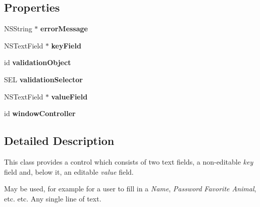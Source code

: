 \subsection*{Properties}
\begin{CompactItemize}
\item 
\hypertarget{interface_s_s_y_labelled_text_field_eec5fc235f435887da8cca159bb17678}{
NSString $\ast$ \textbf{errorMessage}}
\label{interface_s_s_y_labelled_text_field_eec5fc235f435887da8cca159bb17678}

\item 
\hypertarget{interface_s_s_y_labelled_text_field_64538da066a5d16f8b5b86cc25fa803f}{
NSTextField $\ast$ \textbf{keyField}}
\label{interface_s_s_y_labelled_text_field_64538da066a5d16f8b5b86cc25fa803f}

\item 
\hypertarget{interface_s_s_y_labelled_text_field_fd9812fce2d7827fb8a0de538bfdce57}{
id \textbf{validationObject}}
\label{interface_s_s_y_labelled_text_field_fd9812fce2d7827fb8a0de538bfdce57}

\item 
\hypertarget{interface_s_s_y_labelled_text_field_f26505ea73ed035bcf7b86f1c47a9177}{
SEL \textbf{validationSelector}}
\label{interface_s_s_y_labelled_text_field_f26505ea73ed035bcf7b86f1c47a9177}

\item 
\hypertarget{interface_s_s_y_labelled_text_field_e1c317c6cb4c85d0fb46bccc971e7970}{
NSTextField $\ast$ \textbf{valueField}}
\label{interface_s_s_y_labelled_text_field_e1c317c6cb4c85d0fb46bccc971e7970}

\item 
\hypertarget{interface_s_s_y_labelled_text_field_39a9bf9401a0a317e79b3689d2836e61}{
id \textbf{windowController}}
\label{interface_s_s_y_labelled_text_field_39a9bf9401a0a317e79b3689d2836e61}

\end{CompactItemize}


\subsection{Detailed Description}
This class provides a control which consists of two text fields, a non-editable {\em key\/} field and, below it, an editable {\em value\/} field. 

May be used, for example for a user to fill in a {\em Name\/}, {\em Password\/} {\em Favorite Animal\/}, etc. etc. Any single line of text. 

